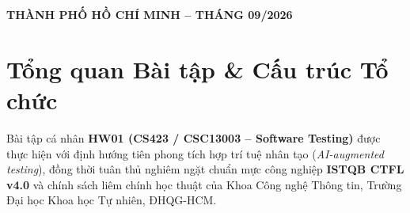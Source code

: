 \documentclass[11pt,a4paper]{article}
\begin{document}
\begin{titlepage}
\begin{tcolorbox}[colback=white, colframe=hcmusblue, boxrule=2pt, arc=0mm, height=\textheight]
\begin{center}
    \vfill
    {\normalsize \textbf{THÀNH PHỐ HỒ CHÍ MINH -- THÁNG 09/2026}}
\end{center}
\end{tcolorbox}
\end{titlepage}

\newpage
{}

\tableofcontents
\newpage

\setcounter{page}{1}

\section{Tổng quan Bài tập \& Cấu trúc Tổ chức}

Bài tập cá nhân \textbf{HW01 (CS423 / CSC13003 -- Software Testing)} được thực hiện với định hướng tiên phong tích hợp trí tuệ nhân tạo (\textit{AI-augmented testing}), đồng thời tuân thủ nghiêm ngặt chuẩn mực công nghiệp \textbf{ISTQB CTFL v4.0} và chính sách liêm chính học thuật của Khoa Công nghệ Thông tin, Trường Đại học Khoa học Tự nhiên, ĐHQG-HCM.
\end{document}
